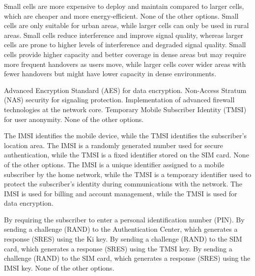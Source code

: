 \begin{questions}
    \begin{checkboxes}
        \choice Small cells are more expensive to deploy and maintain compared to larger cells, which are cheaper and more energy-efficient.
        \choice None of the other options.
        \choice Small cells are only suitable for urban areas, while larger cells can only be used in rural areas.
        \choice Small cells reduce interference and improve signal quality, whereas larger cells are prone to higher levels of interference and degraded signal quality.
        \CorrectChoice Small cells provide higher capacity and better coverage in dense areas but may require more frequent handovers as users move, while larger cells cover wider areas with fewer handovers but might have lower capacity in dense environments.
    \end{checkboxes}

    \begin{checkboxes}
        \CorrectChoice Advanced Encryption Standard (AES) for data encryption.
        \CorrectChoice Non-Access Stratum (NAS) security for signaling protection.
        \choice Implementation of advanced firewall technologies at the network core.
        \choice Temporary Mobile Subscriber Identity (TMSI) for user anonymity.
        \choice None of the other options.
    \end{checkboxes}

    \begin{checkboxes}
        \choice The IMSI identifies the mobile device, while the TMSI identifies the subscriber's location area.
        \choice The IMSI is a randomly generated number used for secure authentication, while the TMSI is a fixed identifier stored on the SIM card.
        \choice None of the other options.
        \CorrectChoice The IMSI is a unique identifier assigned to a mobile subscriber by the home network, while the TMSI is a temporary identifier used to protect the subscriber's identity during communications with the network.
        \choice The IMSI is used for billing and account management, while the TMSI is used for data encryption.
    \end{checkboxes}

    \begin{checkboxes}
        \choice By requiring the subscriber to enter a personal identification number (PIN).
        \choice By sending a challenge (RAND) to the Authentication Center, which generates a response (SRES) using the Ki key.
        \choice By sending a challenge (RAND) to the SIM card, which generates a response (SRES) using the TMSI key.
        \choice By sending a challenge (RAND) to the SIM card, which generates a response (SRES) using the IMSI key.
        \CorrectChoice None of the other options.
    \end{checkboxes}


\end{questions}